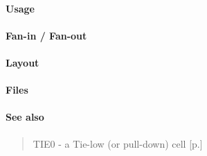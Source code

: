 \paragraph{Usage}

\paragraph{Fan-in / Fan-out}

\paragraph{Layout}

\paragraph{Files}

\paragraph{See also}
\begin{quote}
    TIE0 - a Tie-low (or pull-down) cell [p.\pageref{TIE0}]
\end{quote}
